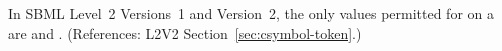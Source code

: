 In SBML Level~2 Versions~1 and Version~2, the only values permitted for
 on a  are
 and
.
(References: L2V2 Section~\ref{sec:csymbol-token}.)
